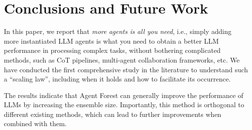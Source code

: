 \section{Conclusions and Future Work}

In this paper, we report that \textit{more agents is all you need}, i.e., simply adding more instantiated LLM agents is what you need to obtain a better LLM performance in processing complex tasks, without bothering complicated methods, such as CoT pipelines, multi-agent collaboration frameworks, etc. 
We have conducted the first comprehensive study in the literature to understand such a ``scaling law'', including when it holds and how to facilitate its occurrence. 

The results indicate that Agent Forest can generally improve the performance of LLMs by increasing the ensemble size. 
Importantly, this method is orthogonal to different existing methods, which can lead to further improvements when combined with them. 

